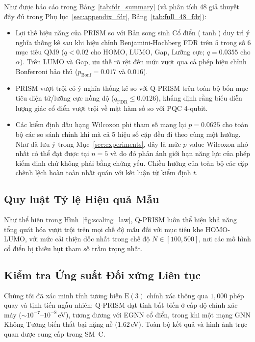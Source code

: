 \documentclass[10pt,twocolumn,letterpaper]{article}
\begin{document}
Như được báo cáo trong Bảng~\ref{tab:fdr_summary} (và phân tích 48 giả thuyết đầy đủ trong Phụ lục~\ref{sec:appendix_fdr}, Bảng~\ref{tab:full_48_fdr}):
\begin{itemize}
    \item Lợi thế hiệu năng của PRISM so với Bản song sinh Cổ điển ($\tanh$) duy trì ý nghĩa thống kê sau khi hiệu chỉnh Benjamini-Hochberg FDR trên $5$ trong số $6$ mục tiêu QM9 ($q < 0.02$ cho HOMO, LUMO, Gap, Lưỡng cực; $q = 0.0355$ cho $\alpha$). Trên LUMO và Gap, ưu thế rõ rệt đến mức vượt qua cả phép hiệu chỉnh Bonferroni bảo thủ ($p_{\mathrm{Bonf}} = 0.017$ và $0.016$).
    \item PRISM vượt trội có ý nghĩa thống kê so với Q-PRISM trên toàn bộ bốn mục tiêu điện tử/lưỡng cực nồng độ ($q_{\mathrm{FDR}} \le 0.0126$), khẳng định rằng biểu diễn lượng giác cổ điển vượt trội về mặt hàm số so với PQC 4-qubit.
    \item Các kiểm định dấu hạng Wilcoxon phi tham số mang lại $p = 0.0625$ cho toàn bộ các so sánh chính khi mà cả 5 hiệu số cặp đều đi theo cùng một hướng. Như đã lưu ý trong Mục~\ref{sec:experiments}, đây là mức $p$-value Wilcoxon nhỏ nhất có thể đạt được tại $n = 5$ và do đó phản ánh giới hạn năng lực của phép kiểm định chứ không phải bằng chứng yếu. Chiều hướng của toàn bộ các cặp chênh lệch hoàn toàn nhất quán với kết luận từ kiểm định $t$.
\end{itemize}

\subsection{Quy luật Tỷ lệ Hiệu quả Mẫu}

Như thể hiện trong Hình~\ref{fig:scaling_law}, Q-PRISM luôn thể hiện khả năng tổng quát hóa vượt trội trên mọi chế độ mẫu đối với mục tiêu khe HOMO-LUMO, với mức cải thiện dốc nhất trong chế độ $N \in [100, 500]$, nơi các mô hình cổ điển bị thiếu hụt tham số trầm trọng nhất.

\subsection{Kiểm tra Ứng suất Đối xứng Liên tục}

Chúng tôi đã xác minh tính tương biến $\mathrm{E}(3)$ chính xác thông qua $1{,}000$ phép quay và tịnh tiến ngẫu nhiên: Q-PRISM đạt tính bất biến ở cấp độ chính xác máy ($\sim 10^{-7}$--$10^{-8}$\,eV), tương đương với EGNN cổ điển, trong khi một mạng GNN Không Tương biến thất bại nặng nề ($1.62$\,eV). Toàn bộ kết quả và hình ảnh trực quan được cung cấp trong SM~C.
\end{document}
